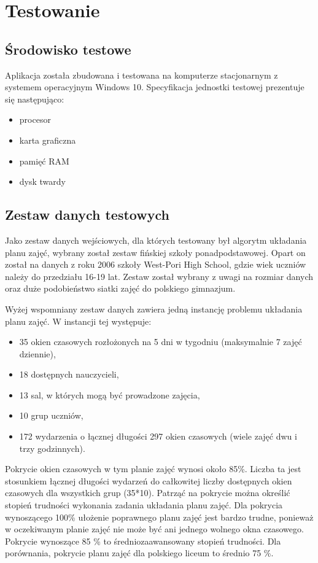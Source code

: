 \chapter{Testowanie}

\section{Środowisko testowe}

Aplikacja została zbudowana i testowana na komputerze stacjonarnym z systemem operacyjnym Windows 10. Specyfikacja jednostki testowej prezentuje się następująco:

\begin{itemize}
\item procesor 
\item karta graficzna
\item pamięć RAM
\item dysk twardy
\end{itemize}

\section{Zestaw danych testowych}

Jako zestaw danych wejściowych, dla których testowany był algorytm układania planu zajęć, wybrany został zestaw fińskiej szkoły ponadpodstawowej. Opart on został na danych z roku 2006 szkoły West-Pori High School, gdzie wiek uczniów należy do przedziału 16-19 lat. Zestaw został wybrany z uwagi na rozmiar danych oraz duże podobieństwo siatki zajęć do polskiego gimnazjum.

Wyżej wspomniany zestaw danych zawiera jedną instancję problemu układania planu zajęć. W instancji tej występuje:

\begin{itemize}
\item 35 okien czasowych rozłożonych na 5 dni w tygodniu (maksymalnie 7 zajęć dziennie),
\item 18 dostępnych nauczycieli,
\item 13 sal, w których mogą być prowadzone zajęcia,
\item 10 grup uczniów,
\item 172 wydarzenia o łącznej długości 297 okien czasowych (wiele zajęć dwu i trzy godzinnych).
\end{itemize}

Pokrycie okien czasowych w tym planie zajęć wynosi około 85\%. Liczba ta jest stosunkiem łącznej długości wydarzeń do całkowitej liczby dostępnych okien czasowych dla wszystkich grup (35*10). Patrząć na pokrycie można określić stopień trudności wykonania zadania układania planu zajęć. Dla pokrycia wynoszącego 100\% ułożenie poprawnego planu zajęć jest bardzo trudne, ponieważ w oczekiwanym planie zajęć nie może być ani jednego wolnego okna czasowego. Pokrycie wynoszące 85 \% to średniozaawansowany stopień trudności. Dla porównania, pokrycie planu zajęć dla polskiego liceum to średnio 75 \%.

